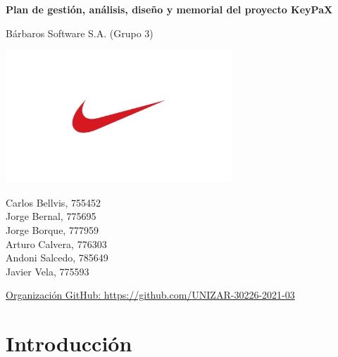 \documentclass{article}
\begin{document}
\begin{titlepage}
    \centering
    \vspace*{\fill}

    \vspace*{0.5cm}

    \Huge 
    \textbf{Plan de gestión, análisis, diseño y memorial del proyecto KeyPaX}
    
    \vspace*{0.5cm}

    \huge
    Bárbaros Software S.A. (Grupo 3)

    \includegraphics[height=5cm]{../images/logo.jpg}

    \begin{Large}
        Carlos Bellvis, 755452\\
        Jorge Bernal, 775695\\
        Jorge Borque, 777959\\
        Arturo Calvera, 776303\\
        Andoni Salcedo, 785649\\
        Javier Vela, 775593\\
    \end{Large}

    \vspace*{1cm}

    \large
    \href{https://github.com/UNIZAR-30226-2021-03}{Organización GitHub: https://github.com/UNIZAR-30226-2021-03}

    \vspace*{\fill}
    
\end{titlepage}

\pagebreak

\tableofcontents

\pagebreak

\section{Introducción}
\end{document}
